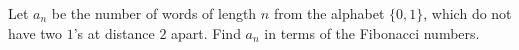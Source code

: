Let $a_n$ be the number of words of length $n$ from the alphabet $\{0, 1\}$, which do not have two $1$'s at distance $2$ apart. Find $a_n$ in terms of the Fibonacci numbers.
